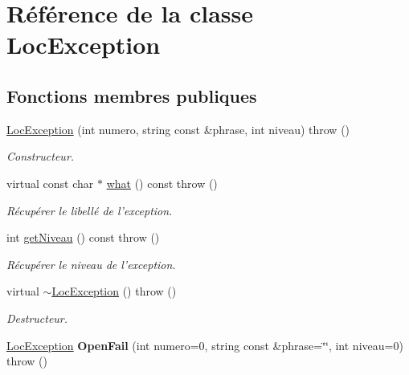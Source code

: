 \hypertarget{class_loc_exception}{
\section{Référence de la classe LocException}
\label{class_loc_exception}
}
\subsection*{Fonctions membres publiques}
\begin{DoxyCompactItemize}
\item 
\hyperlink{class_loc_exception_a3d645ef652cd97c4f962f887958fc524}{LocException} (int numero, string const \&phrase, int niveau)  throw ()
\begin{DoxyCompactList}\small\item\em Constructeur. \item\end{DoxyCompactList}\item 
virtual const char $\ast$ \hyperlink{class_loc_exception_a52ff1f609218097252ac7232a4305e28}{what} () const   throw ()
\begin{DoxyCompactList}\small\item\em Récupérer le libellé de l'exception. \item\end{DoxyCompactList}\item 
int \hyperlink{class_loc_exception_a1ba59653e71c4c564a8336a15b8a224e}{getNiveau} () const   throw ()
\begin{DoxyCompactList}\small\item\em Récupérer le niveau de l'exception. \item\end{DoxyCompactList}\item 
virtual \hyperlink{class_loc_exception_ac76c91ff8b34674c8adaf73e5b526066}{$\sim$LocException} ()  throw ()
\begin{DoxyCompactList}\small\item\em Destructeur. \item\end{DoxyCompactList}\item 
\hypertarget{class_loc_exception_a964415733b549601aad5dcda137a5504}{
\hyperlink{class_loc_exception}{LocException} {\bfseries OpenFail} (int numero=0, string const \&phrase=\char`\"{}\char`\"{}, int niveau=0)  throw ()}
\label{class_loc_exception_a964415733b549601aad5dcda137a5504}

\end{DoxyCompactItemize}



